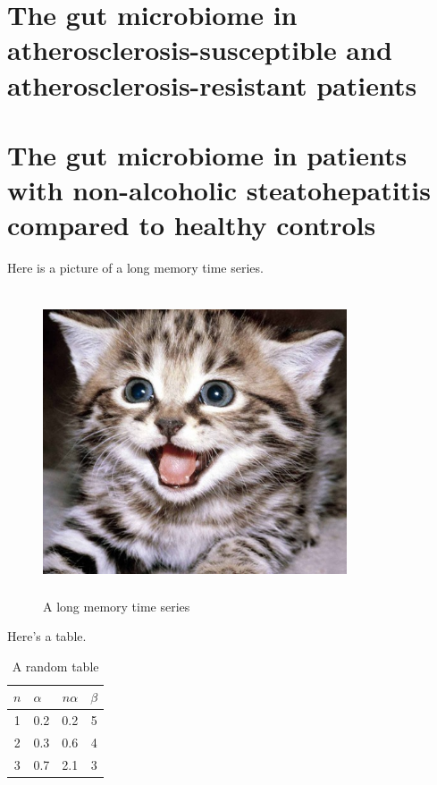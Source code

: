 \section{The gut microbiome in atherosclerosis-susceptible and atherosclerosis-resistant patients}

\section{The gut microbiome in patients with non-alcoholic steatohepatitis compared to healthy controls}












Here is a picture of a long memory time series. 
\begin{figure}[ht]
\begin{center}
\includegraphics[height = 9cm, width = 9cm]{pic1.jpeg}
\caption{A long memory time series\label{ts1}}
\end{center}
\end{figure}

Here's a table.
\begin{table}[ht]
\begin{center}
\begin{tabular}[ht]{|c|lr|c|} 
\hline
$n$ & $\alpha$ &$n\alpha$ & $\beta$\\
\hline
1 & 0.2 & 0.2 & 5\\
\hline
2 & 0.3 & 0.6 & 4\\
\hline
3 & 0.7 & 2.1 & 3\\
\hline
\end{tabular}
\caption{A random table \label{tab1}}
\end{center}
\end{table}

